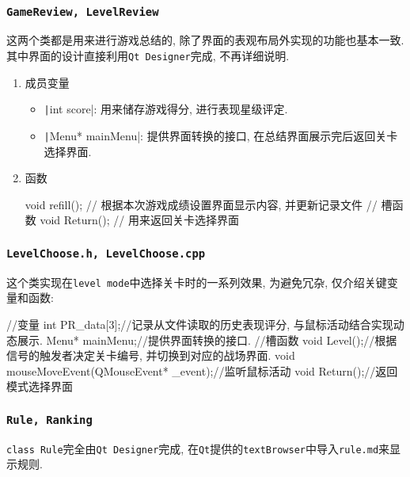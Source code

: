 \documentclass[UTF8,12pt]{ctexart}
\begin{document}
	            ~\par

	        \subsubsection{\tt GameReview, LevelReview}
	            这两个类都是用来进行游戏总结的, 除了界面的表观布局外实现的功能也基本一致. 其中界面的设计直接利用\texttt{Qt Designer}完成, 不再详细说明.
	            \begin{enumerate}
	                \item 成员变量
	                    \begin{itemize}
	                        \item \texttt|int score|: 用来储存游戏得分, 进行表现星级评定.
	                        \item \texttt|Menu* mainMenu|: 提供界面转换的接口, 在总结界面展示完后返回关卡选择界面.
	                    \end{itemize}
	                \item 函数
	                    \begin{cppcode}
                        void refill(); // 根据本次游戏成绩设置界面显示内容, 并更新记录文件
                        // 槽函数
                        void Return(); // 用来返回关卡选择界面
                    \end{cppcode}
	            \end{enumerate}
	        \subsubsection{\tt LevelChoose.h, LevelChoose.cpp}
	            这个类实现在\texttt{level mode}中选择关卡时的一系列效果, 为避免冗杂, 仅介绍关键变量和函数:
	            \begin{cppcode}
                //变量
                int PR_data[3];//记录从文件读取的历史表现评分, 与鼠标活动结合实现动态展示. 
                Menu* mainMenu;//提供界面转换的接口. 
                //槽函数
                void Level();//根据信号的触发者决定关卡编号, 并切换到对应的战场界面. 
                void mouseMoveEvent(QMouseEvent* _event);//监听鼠标活动
                void Return();//返回模式选择界面
            \end{cppcode}

	        \subsubsection{\tt Rule, Ranking}
	            \texttt{class Rule}完全由\texttt{Qt Designer}完成, 在\texttt{Qt}提供的\texttt{textBrowser}中导入\texttt{rule.md}来显示规则.
\end{document}
